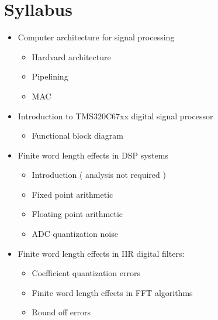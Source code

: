 \documentclass[../course]{subfiles}
\begin{document}
\section{Syllabus}

\begin{itemize}

    \item Computer architecture for signal processing

        \begin{itemize}

            \item Hardvard architecture
            \item Pipelining
            \item MAC

        \end{itemize}

    \item Introduction to TMS320C67xx digital signal processor

        \begin{itemize}

            \item Functional block diagram

        \end{itemize}

    \item Finite word length effects in DSP systems

        \begin{itemize}

            \item Introduction ( analysis not required )
            \item Fixed point arithmetic
            \item Floating point arithmetic
            \item ADC quantization noise

        \end{itemize}

    \item Finite word length effects in IIR digital filters:

        \begin{itemize}

            \item Coefficient quantization errors
            \item Finite word length effects in FFT algorithms
            \item Round off errors

        \end{itemize}

\end{itemize}
\end{document}
